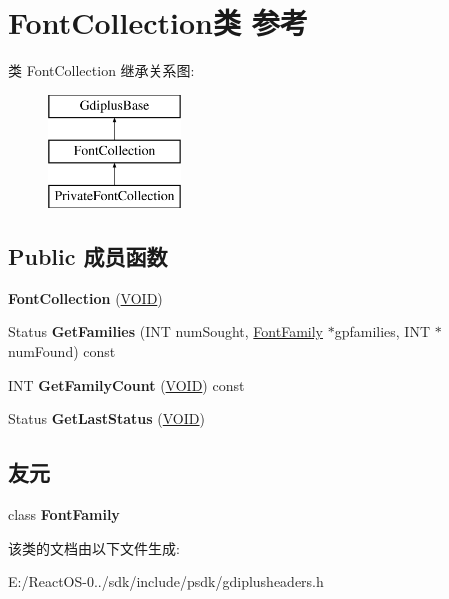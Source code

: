 \hypertarget{class_font_collection}{}\section{Font\+Collection类 参考}
\label{class_font_collection}
类 Font\+Collection 继承关系图\+:\begin{figure}[H]
\begin{center}
\leavevmode
\includegraphics[height=3.000000cm]{class_font_collection}
\end{center}
\end{figure}
\subsection*{Public 成员函数}
\begin{DoxyCompactItemize}
\item 
\mbox{\label{class_font_collection_ab1bce38949e63b5786ce14e704e091b8}} 
{\bfseries Font\+Collection} (\hyperlink{interfacevoid}{V\+O\+ID})
\item 
\mbox{\label{class_font_collection_ab4b479f7a316d15f08ae226aa15f3a59}} 
Status {\bfseries Get\+Families} (I\+NT num\+Sought, \hyperlink{class_font_family}{Font\+Family} $\ast$gpfamilies, I\+NT $\ast$num\+Found) const
\item 
\mbox{\label{class_font_collection_a858ca9fe3fbc85faf23813531991c4c9}} 
I\+NT {\bfseries Get\+Family\+Count} (\hyperlink{interfacevoid}{V\+O\+ID}) const
\item 
\mbox{\label{class_font_collection_a89fa2a962db62a566dd65d866298c6ca}} 
Status {\bfseries Get\+Last\+Status} (\hyperlink{interfacevoid}{V\+O\+ID})
\end{DoxyCompactItemize}
\subsection*{友元}
\begin{DoxyCompactItemize}
\item 
\mbox{\label{class_font_collection_ad6878b18624ffb969d26393c4a60a04c}} 
class {\bfseries Font\+Family}
\end{DoxyCompactItemize}


该类的文档由以下文件生成\+:\begin{DoxyCompactItemize}
\item 
E\+:/\+React\+O\+S-\/0../sdk/include/psdk/gdiplusheaders.\+h\end{DoxyCompactItemize}
